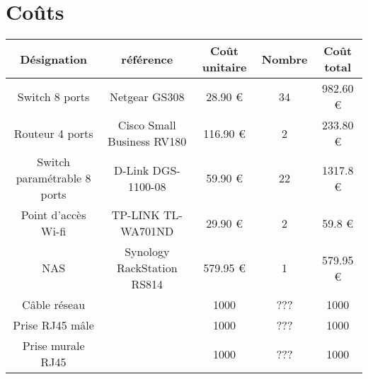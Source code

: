 \documentclass[oneside,10pt]{article}
\begin{document}
\section{Co\^uts}
\begin{tabular}{|c|c|c|c|c|}
  \hline
  D\'esignation & r\'ef\'erence & Co\^ut unitaire & Nombre & Co\^ut total \\
  \hline \hline
  Switch 8 ports & Netgear GS308 & 28.90 \euro & 34 & 982.60 \euro \\
  \hline
  Routeur 4 ports & Cisco Small Business RV180 & 116.90 \euro & 2 & 233.80 \euro \\
  \hline
  Switch param\'etrable 8 ports & D-Link DGS-1100-08 & 59.90 \euro & 22 & 1317.8 \euro \\
  \hline
  Point d'acc\`es Wi-fi & TP-LINK TL-WA701ND & 29.90 \euro & 2 & 59.8 \euro \\
  \hline
  NAS & Synology RackStation RS814 & 579.95 \euro & 1 & 579.95 \euro \\
  \hline
  C\^able r\'eseau & & 1000 & ??? & 1000 \\
  \hline
  Prise RJ45 m\^ale & & 1000 & ??? & 1000 \\
  \hline
  Prise murale RJ45 & & 1000 & ??? & 1000 \\
  \hline
\end{tabular}
\end{document}
